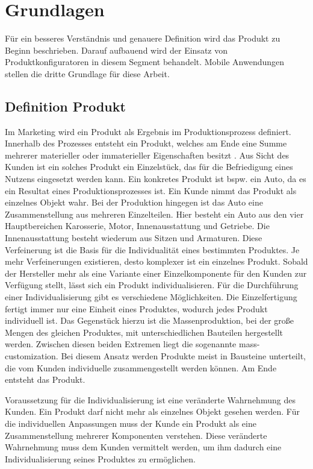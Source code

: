 \chapter{Grundlagen} \label{chapter_2}
Für ein besseres Verständnis und genauere Definition wird das Produkt zu Beginn beschrieben. Darauf aufbauend wird der Einsatz von Produktkonfiguratoren in diesem Segment behandelt. Mobile Anwendungen stellen die dritte Grundlage für diese Arbeit.

\section{Definition Produkt}
Im Marketing wird ein Produkt als Ergebnis im Produktionsprozess definiert. Innerhalb des Prozesses entsteht ein Produkt, welches am Ende eine Summe mehrerer materieller oder immaterieller Eigenschaften besitzt \cite{bib:product}. Aus Sicht des Kunden ist ein solches Produkt ein Einzelstück, das für die Befriedigung eines Nutzens eingesetzt werden kann. Ein konkretes Produkt ist bspw. ein Auto, da es ein Resultat eines Produktionsprozesses ist. Ein Kunde nimmt das Produkt als einzelnes Objekt wahr. Bei der Produktion hingegen ist das Auto eine Zusammenstellung aus mehreren Einzelteilen. Hier besteht ein Auto aus den vier Hauptbereichen Karosserie, Motor, Innenausstattung und Getriebe. Die Innenausstattung besteht wiederum aus Sitzen und Armaturen. Diese Verfeinerung ist die Basis für die Individualität eines bestimmten Produktes. Je mehr Verfeinerungen existieren, desto komplexer ist ein einzelnes Produkt. Sobald der Hersteller mehr als eine Variante einer Einzelkomponente für den Kunden zur Verfügung stellt, lässt sich ein Produkt individualisieren. Für die Durchführung einer Individualisierung gibt es verschiedene Möglichkeiten. Die Einzelfertigung fertigt immer nur eine Einheit eines Produktes, wodurch jedes Produkt individuell ist. Das Gegenstück hierzu ist die Massenproduktion, bei der große Mengen des gleichen Produktes, mit unterschiedlichen Bauteilen hergestellt werden. Zwischen diesen beiden Extremen liegt die sogenannte mass-customization. Bei diesem Ansatz werden Produkte meist in Bausteine unterteilt, die vom Kunden individuelle zusammengestellt werden können. Am Ende entsteht das Produkt.
 \par 

Voraussetzung für die Individualisierung ist eine veränderte Wahrnehmung des Kunden. Ein Produkt darf nicht mehr als einzelnes Objekt gesehen werden. Für die individuellen Anpassungen muss der Kunde ein Produkt als eine Zusammenstellung mehrerer Komponenten verstehen. Diese veränderte Wahrnehmung muss dem Kunden vermittelt werden, um ihm dadurch eine Individualisierung seines Produktes zu ermöglichen. \par

